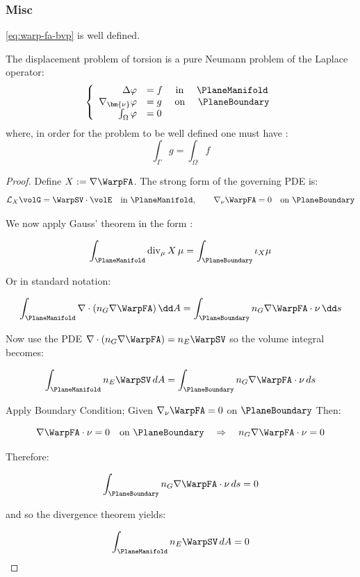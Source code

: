 \subsubsection*{Misc}

\begin{proposition}
\cref{eq:warp-fa-bvp} is well defined.

The displacement problem of torsion is a pure Neumann problem of the
Laplace operator:
\begin{equation*}
\left\{
\begin{array}{rl}
\Delta \varphi &= f \quad \text { in } \quad \PlaneManifold \\
\nabla_{\bm{\nu}} \varphi &= g \quad \text { on } \quad \PlaneBoundary \\
\int_\Omega \varphi &= 0
\end{array}
\right.
\end{equation*}
where, in order for the problem to be well defined one must have \parencite{shapiro2017neumann}:
\[
\int_\Gamma g = \int_{\Omega} f
\]
\end{proposition}

\begin{proof}
Define $X := \nabla \WarpFA$.
%
The strong form of the governing PDE is:
$$
\mathcal{L}_X \volG = \WarpSV \cdot \volE
\quad \text{in } \PlaneManifold,
\qquad
\nabla_\nu \WarpFA = 0 \quad \text{on } \PlaneBoundary
$$

We now apply Gauss' theorem in the form \citep{abraham1988manifolds}:

$$
\int_{\PlaneManifold} \operatorname{div}_\mu X \, \mu = \int_{\PlaneBoundary} \iota_X \mu
$$

Or in standard notation:

$$
\int_{\PlaneManifold} \nabla \cdot (n_G \nabla \WarpFA) \, \dd A = \int_{\PlaneBoundary} n_G \nabla \WarpFA \cdot \nu \, \dd s
$$

Now use the PDE $\nabla \cdot (n_G \nabla \WarpFA) = n_E \WarpSV$ so the volume integral becomes:

$$
\int_{\PlaneManifold} n_E \WarpSV \, dA = \int_{\PlaneBoundary} n_G \nabla \WarpFA \cdot \nu \, ds
$$

Apply Boundary Condition; Given $\nabla_\nu \WarpFA = 0$ on \(\PlaneBoundary\) 
Then:

$$
\nabla \WarpFA \cdot \nu = 0 \quad \text{on } \PlaneBoundary
\quad \Rightarrow \quad
n_G \nabla \WarpFA \cdot \nu = 0
$$

Therefore:

$$
\int_{\PlaneBoundary} n_G \nabla \WarpFA \cdot \nu \, ds = 0
$$

and so the divergence theorem yields:

$$
\int_{\PlaneManifold} n_E \WarpSV \, dA = 0
$$
\end{proof}


